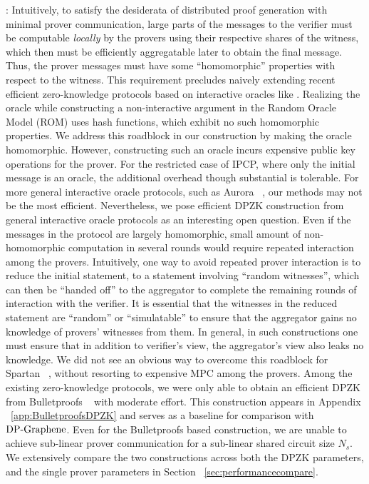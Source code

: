 : Intuitively, to satisfy the desiderata
of distributed proof generation with minimal prover communication, large parts
of the messages to the verifier must be computable {\em locally} by the provers
using their respective shares of the witness, which then must be efficiently 
aggregatable later to obtain the final message. Thus, the prover messages must have some
``homomorphic'' properties with respect to the witness. This requirement
precludes naively extending recent efficient zero-knowledge protocols based on
interactive oracles like \cite{ligero,aurora}. Realizing the oracle while constructing a non-interactive
argument in the Random Oracle Model (ROM) uses hash functions, which exhibit no such
homomorphic properties. We address this roadblock in our construction by making
the oracle homomorphic. However, constructing such an oracle incurs expensive
public key operations for the prover. For the restricted case of IPCP, where
only the initial message is an oracle, the additional overhead though
substantial is tolerable. For more general interactive oracle protocols, such as
Aurora ~\cite{aurora}, our methods may not be the most efficient. Nevertheless,
we pose efficient DPZK construction from general interactive oracle protocols as an
interesting open question. Even if the messages in the protocol are largely
homomorphic, small amount of non-homomorphic computation in several rounds 
would require repeated interaction among the provers. Intuitively, one way to
avoid repeated prover interaction is to reduce the initial statement, to a
statement involving ``random witnesses'', which can then be ``handed off'' to the
aggregator to complete the remaining rounds of interaction with the verifier. It is essential that
the witnesses in the reduced statement are ``random'' or ``simulatable'' to
ensure that the aggregator gains no knowledge of provers' witnesses from them.
In general, in such constructions one must ensure that in addition to verifier's
view, the aggregator's view also leaks no knowledge. We did not see an obvious
way to overcome this roadblock for Spartan ~\cite{spartan}, without resorting to
expensive MPC among the provers. Among the existing zero-knowledge protocols, we
were only able to obtain an efficient DPZK from Bulletproofs
~\cite{bulletproofs} with moderate effort. This construction appears in Appendix ~\ref{app:BulletproofsDPZK}
and serves as a baseline for
comparison with $\text{DP-Graphene}$. Even for the Bulletproofs based construction, we are
unable to achieve sub-linear prover communication for a sub-linear shared circuit
size $N_s$. We extensively compare the two constructions across both the DPZK
parameters, and the single prover parameters in Section
~\ref{sec:performancecompare}.
  
